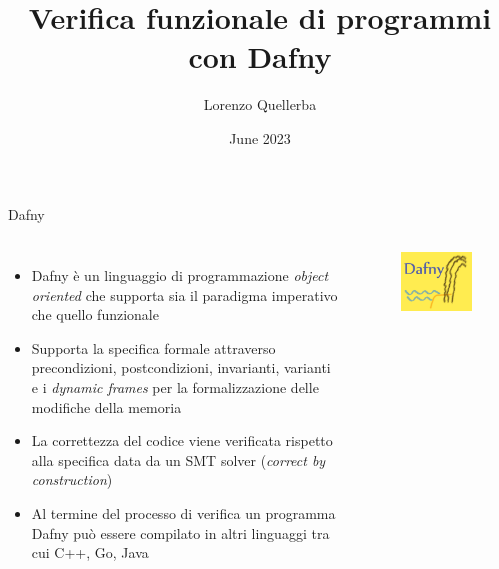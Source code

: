 \documentclass{beamer}
\title{Verifica funzionale di programmi con Dafny}
\author{Lorenzo Quellerba}
\institute{Univeristà degli Studi di Torino}
\date{June 2023}
\begin{document}
\maketitle


\begin{frame}{Dafny}
    \begin{columns}[onlytextwidth]
        \begin{itemize}
            \item Dafny è un linguaggio di programmazione \textit{object oriented} che supporta sia il paradigma imperativo che quello funzionale
            \item Supporta la specifica formale attraverso precondizioni, postcondizioni, invarianti, varianti e i \textit{dynamic frames} per la formalizzazione delle modifiche della memoria
            \item La correttezza del codice viene verificata rispetto alla specifica data da un SMT solver (\textit{correct by construction})
            \item Al termine del processo di verifica un programma Dafny può essere compilato in altri linguaggi tra cui C++, Go, Java
        \end{itemize}
        \begin{figure}
            \includegraphics[scale=0.4]{./assets/images/dafny-logo-230.png}
        \end{figure}
    \end{columns}
\end{frame}
\end{document}
